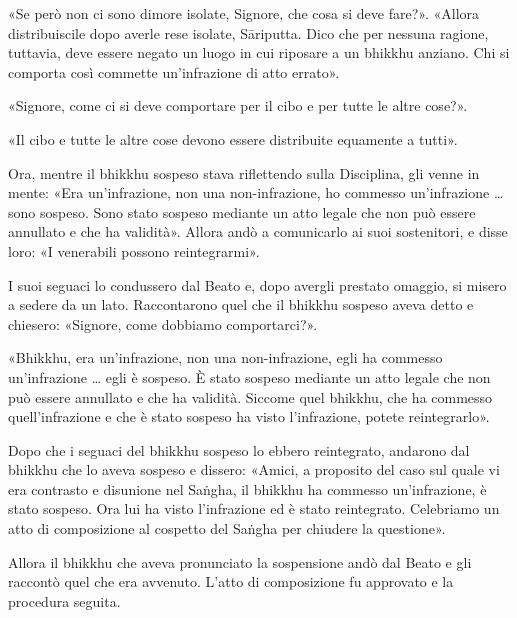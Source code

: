 «Se però non ci sono dimore isolate, Signore, che cosa si deve fare?».
«Allora distribuiscile dopo averle rese isolate, Sāriputta. Dico che per
nessuna ragione, tuttavia, deve essere negato un luogo in cui riposare a
un bhikkhu anziano. Chi si comporta così commette un’infrazione di atto
errato».


«Signore, come ci si deve comportare per il cibo e per tutte le altre
cose?».


«Il cibo e tutte le altre cose devono essere distribuite equamente a
tutti».


Ora, mentre il bhikkhu sospeso stava riflettendo sulla Disciplina, gli
venne in mente: «Era un’infrazione, non una non-infrazione, ho commesso
un’infrazione … sono sospeso. Sono stato sospeso mediante un atto legale
che non può essere annullato e che ha validità». Allora andò a
comunicarlo ai suoi sostenitori, e disse loro: «I venerabili possono
reintegrarmi».


I suoi seguaci lo condussero dal Beato e, dopo avergli prestato omaggio,
si misero a sedere da un lato. Raccontarono quel che il bhikkhu sospeso
aveva detto e chiesero: «Signore, come dobbiamo comportarci?».


«Bhikkhu, era un’infrazione, non una non-infrazione, egli ha commesso
un’infrazione … egli è sospeso. È stato sospeso mediante un atto legale
che non può essere annullato e che ha validità. Siccome quel bhikkhu,
che ha commesso quell’infrazione e che è stato sospeso ha visto
l’infrazione, potete reintegrarlo».


Dopo che i seguaci del bhikkhu sospeso lo ebbero reintegrato, andarono
dal bhikkhu che lo aveva sospeso e dissero: «Amici, a proposito del caso
sul quale vi era contrasto e disunione nel Saṅgha, il bhikkhu ha
commesso un’infrazione, è stato sospeso. Ora lui ha visto l’infrazione
ed è stato reintegrato. Celebriamo un atto di composizione al cospetto
del Saṅgha per chiudere la questione».


Allora il bhikkhu che aveva pronunciato la sospensione andò dal Beato e
gli raccontò quel che era avvenuto. L’atto di composizione fu approvato
e la procedura seguita.




